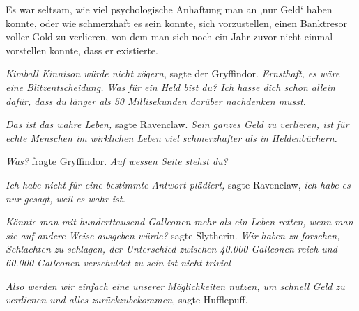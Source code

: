 Es war seltsam, wie viel psychologische Anhaftung man an ‚nur Geld‘ haben konnte, oder wie schmerzhaft es sein konnte, sich vorzustellen, einen Banktresor voller Gold zu verlieren, von dem man sich noch ein Jahr zuvor nicht einmal vorstellen konnte, dass er existierte.

\emph{Kimball Kinnison würde nicht zögern}, sagte der Gryffindor. \emph{Ernsthaft, es wäre eine Blitzentscheidung. Was für ein Held bist du? Ich hasse dich schon allein dafür, dass du länger als 50 Millisekunden darüber nachdenken musst.}

\emph{Das ist das wahre Leben,} sagte Ravenclaw. \emph{Sein ganzes Geld zu verlieren, ist für echte Menschen im wirklichen Leben viel schmerzhafter als in Heldenbüchern.}

\emph{Was?} fragte Gryffindor. \emph{Auf wessen Seite stehst du?}

\emph{Ich habe nicht für eine bestimmte Antwort plädiert,} sagte Ravenclaw, \emph{ich habe es nur gesagt, weil es wahr ist.}

\emph{Könnte man mit hunderttausend Galleonen mehr als ein Leben retten, wenn man sie auf andere Weise ausgeben würde?} sagte Slytherin. \emph{Wir haben zu forschen, Schlachten zu schlagen, der Unterschied zwischen 40.000 Galleonen reich und 60.000 Galleonen verschuldet zu sein ist nicht trivial —}

\emph{Also werden wir einfach eine unserer Möglichkeiten nutzen, um schnell Geld zu verdienen und alles zurückzubekommen,} sagte Hufflepuff.

